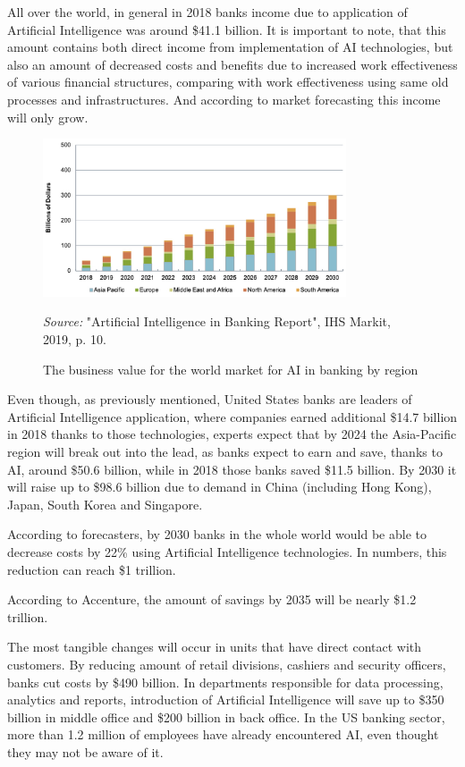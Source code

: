 All over the world, in general in 2018 banks income due to application of Artificial Intelligence was around \$41.1 billion. 
It is important to note, that this amount contains both direct income from implementation of AI technologies, but also
an amount of decreased costs and benefits due to increased work effectiveness of various financial structures, comparing with work effectiveness using same old processes and infrastructures.
And according to market forecasting this income will only grow.
\cite{ihs_markit}

\begin{figure}
    \centering
    \includegraphics[width=0.8\textwidth,height=\textheight,keepaspectratio]{images/Banking_AI_Business_Value.png}
    \caption{The business value for the world market for AI in banking by region}
    \medskip
    \footnotesize\textit{Source:} "Artificial Intelligence in Banking Report", IHS Markit, 2019, p. 10.
\end{figure}

Even though, as previously mentioned, United States banks are leaders of Artificial Intelligence application, where companies earned additional \$14.7 billion in 2018 thanks to those technologies, experts expect that by 2024 the Asia-Pacific region will break out into the lead, as banks expect to earn and save, thanks to AI, around \$50.6 billion, while in 2018 those banks saved \$11.5 billion.
By 2030 it will raise up to \$98.6 billion due to demand in China (including Hong Kong), Japan, South Korea and Singapore.
\cite{ihs_markit}

According to forecasters, by 2030 banks in the whole world would be able to decrease costs by 22\% using Artificial Intelligence technologies. 
In numbers, this reduction can reach \$1 trillion.
\cite{trillion_opportunity}

According to Accenture, the amount of savings by 2035 will be nearly \$1.2 trillion.
\cite{accenture_ai_banking}

The most tangible changes will occur in units that have direct contact with customers.
By reducing amount of retail divisions, cashiers and security officers, banks cut costs by \$490 billion.
In departments responsible for data processing, analytics and reports, 
introduction of Artificial Intelligence will save up to \$350 billion in middle office and \$200 billion in back office.
In the US banking sector, more than 1.2 million of employees have already encountered AI, even thought they may not be aware of it.


